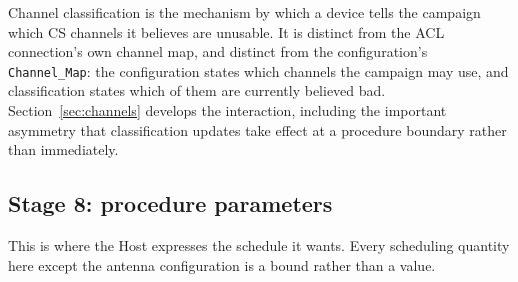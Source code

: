 \documentclass[11pt,a4paper]{article}
\newcommand{\code}[1]{\texttt{\small #1}}
\begin{document}
Channel classification is the mechanism by which a device tells the campaign which CS channels it
believes are unusable. It is distinct from the ACL connection's own channel map, and distinct from
the configuration's \code{Channel\_Map}: the configuration states which channels the campaign may
use, and classification states which of them are currently believed bad. Section~\ref{sec:channels}
develops the interaction, including the important asymmetry that classification updates take effect
at a procedure boundary rather than immediately.

\subsection{Stage 8: procedure parameters}
\label{sec:config-procparams}

This is where the Host expresses the schedule it wants. Every scheduling quantity here except the
antenna configuration is a bound rather than a value.
\end{document}

